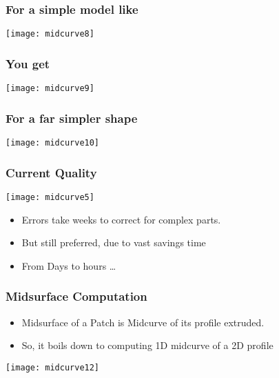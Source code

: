 \begin{frame}[fragile]\frametitle{For a simple model like}
\begin{center}
\texttt{[image: midcurve8]}
\end{center}	
\end{frame}

\begin{frame}[fragile]\frametitle{You get}
\begin{center}
\texttt{[image: midcurve9]}
\end{center}	
\end{frame}

\begin{frame}[fragile]\frametitle{For a far simpler shape}
\begin{center}
\texttt{[image: midcurve10]}
\end{center}	
\end{frame}

\begin{frame}[fragile]\frametitle{Current Quality}
\begin{center}
\texttt{[image: midcurve5]}
\end{center}
	\begin{itemize}
	\item Errors take weeks to correct for complex parts.
	\item But still preferred, due to vast savings time
	\item From Days to hours \ldots
	\end{itemize}
	
\end{frame}

\begin{frame}[fragile]\frametitle{Midsurface Computation}

	\begin{itemize}
	\item Midsurface of a Patch is Midcurve of its profile extruded.
	\item So, it boils down to computing 1D midcurve of a 2D profile
	\end{itemize}
\begin{center}
\texttt{[image: midcurve12]}
\end{center}	
\end{frame}

